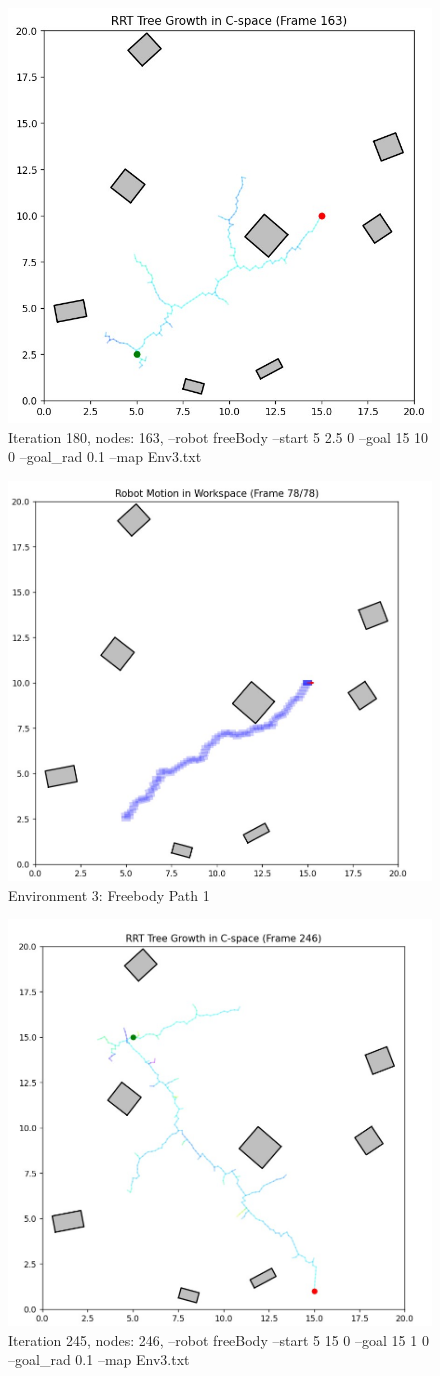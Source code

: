 \documentclass{article}
\begin{document}
\begin{figure} [H]
    \centering
    \includegraphics[width=0.5\linewidth]{latex_media/Env3TreeGrowthFB1.jpg}
    \caption{Iteration 180, nodes: 163, --robot freeBody --start 5 2.5 0 --goal 15 10 0 --goal\_rad 0.1 --map Env3.txt}
\end{figure}

\begin{figure} [H]
    \centering
    \includegraphics[width=0.5\linewidth]{latex_media/Env3RobotPathFB1.jpg}
    \caption{Environment 3: Freebody Path 1}
\end{figure}

\begin{figure} [H]
    \centering
    \includegraphics[width=0.5\linewidth]{latex_media/Env3TreeGrowthFB2.jpg}
    \caption{Iteration 245, nodes: 246, --robot freeBody --start 5 15 0 --goal 15 1 0 --goal\_rad 0.1 --map Env3.txt}
\end{figure}
\end{document}
